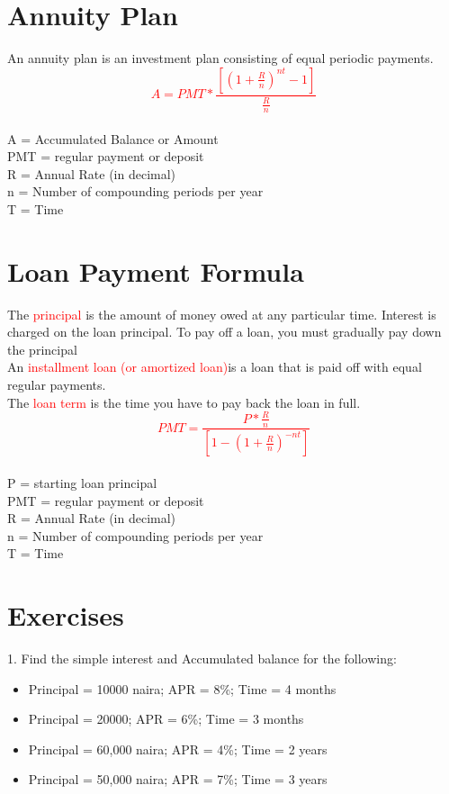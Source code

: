 \documentclass{article}
\begin{document}
    \section{Annuity Plan}
	An annuity plan is an investment plan consisting of equal periodic payments.\\
	\textcolor{red}{\begin{equation}
			A = PMT * \frac{[(1+ \frac{R}{n})^{nt} - 1]}{\frac{R}{n}}
		\end{equation}}\\
		A = Accumulated Balance or Amount\\
		PMT  = regular payment  or deposit
\\
		R = Annual Rate (in decimal)
\\
		n = Number of compounding periods per year
\\
		T = Time
\\
			\newpage
		\section{Loan Payment Formula}
		The \textcolor{red}{principal} is the amount of money owed at any particular time. Interest is charged on the loan principal. To pay off a loan, you must gradually pay down the principal\\
		An \textcolor{red}{installment loan (or amortized loan)}is a loan that is paid off with equal regular payments.
\\
		The \textcolor{red}{loan term} is the time you have to pay back the loan in full.
\\
		\textcolor{red}{\begin{equation}
				PMT = \frac{P*\frac{R}{n}}{[1-(1+\frac{R}{n})^{-nt}]}
		\end{equation}}\\
		P = starting loan principal\\
		PMT  = regular payment  or deposit
\\
		R = Annual Rate (in decimal)
\\
		n = Number of compounding periods per year
\\
		T = Time
		\newpage
		\section{Exercises}
		1. Find the simple interest and Accumulated balance for the following:
		\begin{itemize}
			\item Principal = 10000 naira; APR = 8\%; Time = 4 months
			\item Principal = 20000; APR = 6\%; Time = 3 months
			\item Principal = 60,000 naira; APR = 4\%; Time = 2 years
			\item Principal = 50,000 naira; APR = 7\%; Time = 3 years
		\end{itemize}
		
\end{document}
